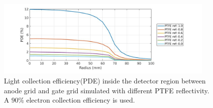 
\begin{figure}[!ht]
  \centering
  \includegraphics[width=0.95\textwidth]
  {Figures/Ch10/PTFESweep_Full.jpg}
  \caption{Light collection efficiency(PDE) inside the detector region between anode grid and gate grid simulated with different PTFE reflectivity. A $90\%$ electron collection efficiency is used. }
  \label{fig: light collection vs PTFE ref}
\end{figure}

